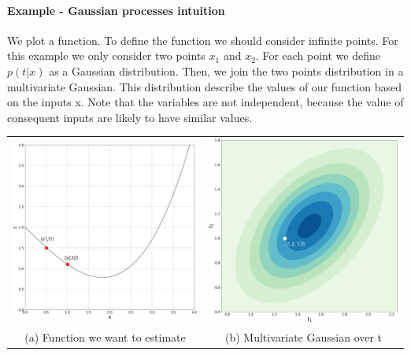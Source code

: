\documentclass[../main.tex]{subfiles}
\begin{document}
\paragraph{Example - Gaussian processes intuition}
We plot a function. To define the function we should consider infinite points. For this example we only consider two points $x_1$ and $x_2$. For each point we define $p(t|x)$ as a Gaussian distribution. Then, we join the two points distribution in a multivariate Gaussian.
This distribution describe the values of our function based on the inputs x. Note that the variables are not independent, because the value of consequent inputs are likely to have similar values.
\newpage
\begin{center}
    \begin{tabular}{cc}
        \includegraphics[width=80mm]{images/GaussianProcesses.jpg} &
        \includegraphics[width=80mm]{images/MultivariateGaussian.jpg}                                 \\
        (a) Function we want to estimate                           & (b) Multivariate Gaussian over t
    \end{tabular}
\end{center}
\end{document}
